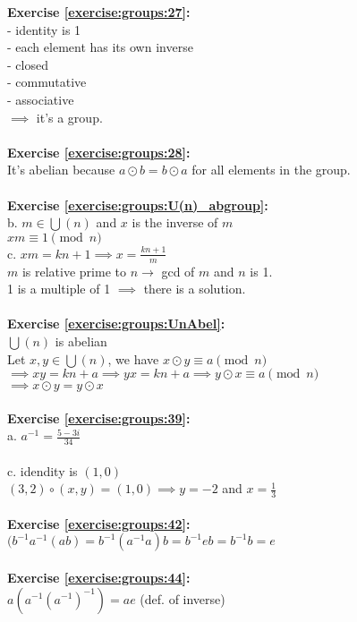\textbf{Exercise \ref{exercise:groups:27}:}\\
- identity is 1\\
- each element has its own inverse\\
- closed\\
- commutative\\
- associative\\
$\implies$  it's a group.\\
\\
\textbf{Exercise \ref{exercise:groups:28}:}\\
It's abelian because $a\odot b=b\odot a$ for all elements in the group.\\
\\
\textbf{Exercise \ref{exercise:groups:U(n)_abgroup}:}\\
b. $m\in\bigcup(n)$ and $x$ is the inverse of $m$\\
$xm\equiv 1 \pmod{n}$\\
c. $xm=kn+1\implies x=\displaystyle\frac{kn+1}{m}$\\
$m$ is relative prime to $n\to$ gcd of $m$ and $n$ is 1.\\
1 is a multiple of 1 $\implies$  there is a solution.\\
\\
\textbf{Exercise \ref{exercise:groups:UnAbel}:}\\
$\bigcup(n)$ is abelian\\
Let $x,y\in\bigcup(n)$, we have $x\odot y\equiv a\pmod{n}$\\
$\implies xy=kn+a\implies yx=kn+a\implies y\odot x\equiv a\pmod{n}$\\
$\implies x\odot y=y\odot x$\\
\\
\textbf{Exercise \ref{exercise:groups:39}:}\\
a. $a^{-1}=\displaystyle\frac{5-3i}{34}$\\
\\
c. idendity is $(1,0)$\\
$(3,2)\circ(x,y)=(1,0)\implies y=-2$ and $x=\displaystyle\frac{1}{3}$\\
\\
\textbf{Exercise \ref{exercise:groups:42}:}\\
$(b^{-1}a^{-1}(ab)=b^{-1}(a^{-1}a)b=b^{-1}eb=b^{-1}b=e$\\
\\
\textbf{Exercise \ref{exercise:groups:44}:}\\
$a(a^{-1}(a^{-1})^{-1})=ae$ (def. of inverse)\\
